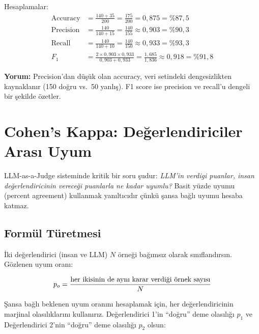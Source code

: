 Hesaplamalar:
\begin{align}
\text{Accuracy} &= \frac{140 + 35}{200} = \frac{175}{200} = 0{,}875 = \%87{,}5 \\[4pt]
\text{Precision} &= \frac{140}{140 + 15} = \frac{140}{155} \approx 0{,}903 = \%90{,}3 \\[4pt]
\text{Recall} &= \frac{140}{140 + 10} = \frac{140}{150} \approx 0{,}933 = \%93{,}3 \\[4pt]
F_1 &= \frac{2 \times 0{,}903 \times 0{,}933}{0{,}903 + 0{,}933} = \frac{1{,}685}{1{,}836} \approx 0{,}918 = \%91{,}8
\end{align}

\textbf{Yorum:} Precision'dan d\"{u}\c{s}\"{u}k olan accuracy, veri setindeki dengesizlikten kaynaklan{\i}r (150 do\u{g}ru vs.\ 50 yanl{\i}\c{s}). F1 score ise precision ve recall'u dengeli bir \c{s}ekilde \"{o}zetler.

\section{Cohen's Kappa: De\u{g}erlendiriciler Aras{\i} Uyum}
\label{sec:cohens-kappa}

LLM-as-a-Judge sisteminde kritik bir soru \c{s}udur: \emph{LLM'in verdigi puanlar, insan de\u{g}erlendiricinin verece\u{g}i puanlarla ne kadar uyumlu?} Basit y\"{u}zde uyumu (percent agreement) kullanmak yan{\i}lt{\i}c{\i}d{\i}r \c{c}\"{u}nk\"{u} \c{s}ansa ba\u{g}l{\i} uyumu hesaba katmaz.

\subsection{Form\"{u}l T\"{u}retmesi}

\.{I}ki de\u{g}erlendirici (insan ve LLM) $N$ \"{o}rne\u{g}i ba\u{g}{\i}ms{\i}z olarak s{\i}n{\i}fland{\i}rs{\i}n. G\"{o}zlenen uyum oran{\i}:

\begin{equation}
p_o = \frac{\text{her ikisinin de ayn{\i} karar verdi\u{g}i \"{o}rnek say{\i}s{\i}}}{N}
\end{equation}

\c{S}ansa ba\u{g}l{\i} beklenen uyum oran{\i}n{\i} hesaplamak i\c{c}in, her de\u{g}erlendiricinin marjinal olas{\i}l{\i}klar{\i}n{\i} kullan{\i}r{\i}z. De\u{g}erlendirici 1'in ``do\u{g}ru'' deme olas{\i}l{\i}\u{g}{\i} $p_1$ ve De\u{g}erlendirici 2'nin ``do\u{g}ru'' deme olas{\i}l{\i}\u{g}{\i} $p_2$ olsun:

